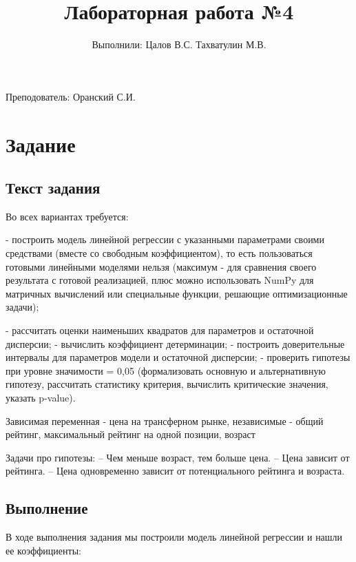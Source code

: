 \documentclass{article}
\title{Лабораторная работа №4}
\author{Выполнили: Цалов В.С. Тахватулин М.В.}
\begin{document}
\maketitle
\begin{center}
      {\fontsize{14}{15}\selectfont
            Преподователь: Оранский С.И.
      }
\end{center}


\section{Задание}\label{sec:-no1}
\subsection{Текст задания}\label{subsec:-2}
Во всех вариантах требуется:

- построить модель линейной регрессии с указанными параметрами своими средствами (вместе со свободным коэффициентом),
то есть пользоваться готовыми линейными моделями нельзя (максимум - для сравнения своего результата с готовой
реализацией, плюс можно использовать NumPy для матричных вычислений или специальные функции, решающие оптимизационные
задачи);

- рассчитать оценки наименьших квадратов для параметров и остаточной дисперсии;
- вычислить коэффициент детерминации;
- построить доверительные интервалы для параметров модели и остаточной дисперсии;
- проверить гипотезы при уровне значимости \alph = 0,05 (формализовать основную и альтернативную гипотезу, рассчитать
статистику критерия, вычислить критические значения, указать p-value).


Зависимая переменная - цена на трансферном рынке, независимые - общий рейтинг, максимальный рейтинг на одной позиции,
возраст

Задачи про гипотезы:\newline
– Чем меньше возраст, тем больше цена.\newline
– Цена зависит от рейтинга.\newline
– Цена одновременно зависит от потенциального рейтинга и возраста.\newline

\subsection{Выполнение}\label{subsec:3}

В ходе выполнения задания мы построили модель линейной регрессии и нашли ее коэффициенты:
\end{document}

